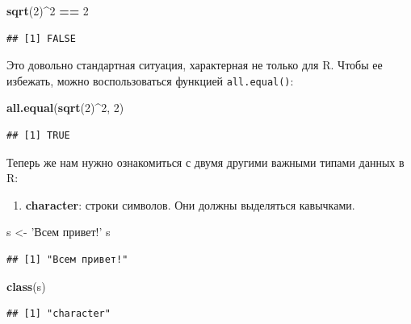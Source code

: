 \documentclass[
]{book}
\newenvironment{Shaded}{\begin{snugshade}}{\end{snugshade}}
\newcommand{\DecValTok}[1]{\textcolor[rgb]{0.00,0.00,0.81}{#1}}
\newcommand{\KeywordTok}[1]{\textcolor[rgb]{0.13,0.29,0.53}{\textbf{#1}}}
\newcommand{\NormalTok}[1]{#1}
\newcommand{\OperatorTok}[1]{\textcolor[rgb]{0.81,0.36,0.00}{\textbf{#1}}}
\newcommand{\StringTok}[1]{\textcolor[rgb]{0.31,0.60,0.02}{#1}}
\providecommand{\tightlist}{%
  \setlength{\itemsep}{0pt}\setlength{\parskip}{0pt}}
\begin{document}
\begin{Shaded}
\begin{Highlighting}[]
\KeywordTok{sqrt}\NormalTok{(}\DecValTok{2}\NormalTok{)}\OperatorTok{^}\DecValTok{2} \OperatorTok{==}\StringTok{ }\DecValTok{2}
\end{Highlighting}
\end{Shaded}

\begin{verbatim}
## [1] FALSE
\end{verbatim}

Это довольно стандартная ситуация, характерная не только для R. Чтобы ее избежать, можно воспользоваться функцией \texttt{all.equal()}:

\begin{Shaded}
\begin{Highlighting}[]
\KeywordTok{all.equal}\NormalTok{(}\KeywordTok{sqrt}\NormalTok{(}\DecValTok{2}\NormalTok{)}\OperatorTok{^}\DecValTok{2}\NormalTok{, }\DecValTok{2}\NormalTok{)}
\end{Highlighting}
\end{Shaded}

\begin{verbatim}
## [1] TRUE
\end{verbatim}

Теперь же нам нужно ознакомиться с двумя другими важными типами данных в R:

\begin{enumerate}
\def\labelenumi{\arabic{enumi}.}
\tightlist
\item
  \textbf{character}: строки символов. Они должны выделяться кавычками.
\end{enumerate}

\begin{Shaded}
\begin{Highlighting}[]
\NormalTok{s <-}\StringTok{ 'Всем привет!'}
\NormalTok{s}
\end{Highlighting}
\end{Shaded}

\begin{verbatim}
## [1] "Всем привет!"
\end{verbatim}

\begin{Shaded}
\begin{Highlighting}[]
\KeywordTok{class}\NormalTok{(s)}
\end{Highlighting}
\end{Shaded}

\begin{verbatim}
## [1] "character"
\end{verbatim}
\end{document}
